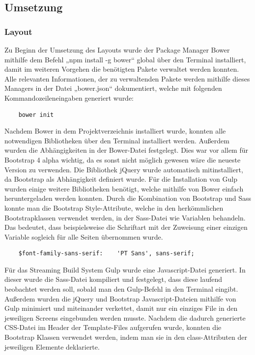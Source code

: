   \subsection{Umsetzung}

    \subsubsection{Layout}

	Zu Beginn der Umsetzung des Layouts wurde der Package Manager Bower mithilfe dem Befehl „npm install -g bower“ global über den Terminal installiert, damit im weiteren Vorgehen die benötigten Pakete verwaltet werden konnten. Alle relevanten Informationen, der zu verwaltenden Pakete werden mithilfe dieses Managers in der Datei „bower.json“ dokumentiert, welche mit folgenden Kommandozeileneingaben generiert wurde:
	\lstset{language = bash}
  	\begin{lstlisting}
  	bower init
  	\end{lstlisting}
Nachdem Bower in dem Projektverzeichnis installiert wurde, konnten alle notwendigen Bibliotheken über den Terminal installiert werden. Außerdem wurden die Abhängigkeiten in der Bower-Datei festgelegt. Dies war vor allem für Bootstrap 4 alpha wichtig, da es sonst nicht möglich gewesen wäre die neueste Version zu verwenden. Die Bibliothek jQuery wurde automatisch mitinstalliert, da Bootstrap als Abhängigkeit definiert wurde. Für die Installation von Gulp wurden einige weitere Bibliotheken benötigt, welche mithilfe von Bower einfach heruntergeladen werden konnten.
Durch die Kombination von Bootstrap und Sass konnte man die Bootstrap Style-Attribute, welche in den herkömmlichen Bootstrapklassen verwendet werden, in der Sass-Datei wie Variablen behandeln. Das bedeutet, dass beispielsweise die Schriftart mit der Zuweisung einer einzigen Variable sogleich für alle Seiten übernommen wurde.
	\lstset{language = html}
  	\begin{lstlisting}
  	$font-family-sans-serif:	'PT Sans', sans-serif;
  	\end{lstlisting}
Für das Streaming Build System Gulp wurde eine Javascript-Datei generiert. In dieser wurde die Sass-Datei kompiliert und festgelegt, dass diese laufend beobachtet werden soll, sobald man den Gulp-Befehl in den Terminal eingibt. Außerdem wurden die jQuery und Bootstrap Javascript-Dateien mithilfe von Gulp minimiert und miteinander verkettet, damit nur ein einziges File in den jeweiligen Screens eingebunden werden musste.
Nachdem die dadurch generierte CSS-Datei im Header der Template-Files aufgerufen wurde, konnten die Bootstrap Klassen verwendet werden, indem man sie in den class-Attributen der jeweiligen Elemente deklarierte. 
